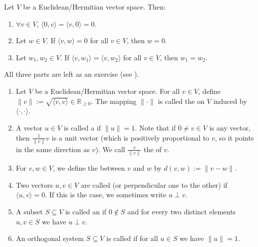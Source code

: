 \begin{lemma}
\label{lem:basic_properties_inner_prod}
Let $V$ be a Euclidean/Hermitian vector space. Then:
\begin{enumerate}[label=\textbf{(\alph*)}]
    \item $\forall v \in V$, $\langle 0, v \rangle = \langle v, 0 \rangle = 0$.
    \item Let $w \in V$. If $\langle v, w \rangle = 0$ for all $v \in V$, then $w = 0$.
    \item Let $w_1, w_2 \in V$. If $\langle v, w_1 \rangle = \langle v, w_2 \rangle$ for all $v \in V$, then $w_1 = w_2$.
\end{enumerate}
All three parts are left as an exercise (see ).
\end{lemma}

\begin{definition}
\label{def:norm_distance_orthogonality}
\begin{enumerate}[label=\textbf{(\alph*)}]
    \item Let $V$ be a Euclidean/Hermitian vector space. For all $v \in V$, define $\|v\| := \sqrt{\langle v, v \rangle} \in \mathbb{R}_{\geq 0}$. The mapping $\| \cdot \|$ is called the  on $V$ induced by $\langle \cdot, \cdot \rangle$.
    \item A vector $u \in V$ is called a  if $\|u\| = 1$. Note that if $0 \neq v \in V$ is any vector, then $\frac{1}{\|v\|}v$ is a unit vector (which is positively proportional to $v$, so it points in the same direction as $v$). We call $\frac{v}{\|v\|}$ the  of $v$.
    \item For $v, w \in V$, we define the  between $v$ and $w$ by $d(v, w) := \|v - w\|$.
    \item Two vectors $u, v \in V$ are called  (or perpendicular one to the other) if $\langle u, v \rangle = 0$. If this is the case, we sometimes write $u \perp v$.
    \item A subset $S \subseteq V$ is called an  if $0 \notin S$ and for every two distinct elements $u, v \in S$ we have $u \perp v$.
    \item An orthogonal system $S \subseteq V$ is called  if for all $u \in S$ we have $\|u\| = 1$.
\end{enumerate}
\end{definition}

